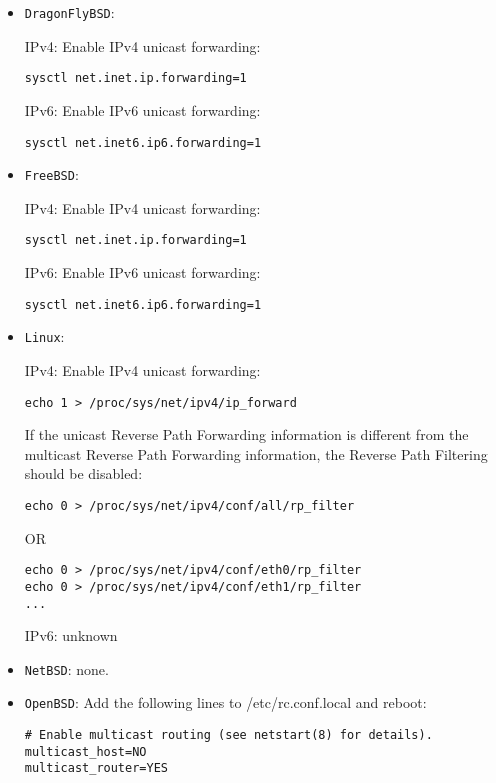 \begin{itemize}
\begin{itemize}
    \item {\tt DragonFlyBSD}:

    IPv4: Enable IPv4 unicast forwarding:

\begin{verbatim}
sysctl net.inet.ip.forwarding=1
\end{verbatim}

    IPv6: Enable IPv6 unicast forwarding:

\begin{verbatim}
sysctl net.inet6.ip6.forwarding=1
\end{verbatim}

    \item {\tt FreeBSD}:

    IPv4: Enable IPv4 unicast forwarding:

\begin{verbatim}
sysctl net.inet.ip.forwarding=1
\end{verbatim}

    IPv6: Enable IPv6 unicast forwarding:

\begin{verbatim}
sysctl net.inet6.ip6.forwarding=1
\end{verbatim}

    \item {\tt Linux}:

    IPv4: Enable IPv4 unicast forwarding:

\begin{verbatim}
echo 1 > /proc/sys/net/ipv4/ip_forward
\end{verbatim}

    If the unicast Reverse Path Forwarding information is different from the
    multicast Reverse Path Forwarding information, the Reverse Path Filtering
    should be disabled:

\begin{verbatim}
echo 0 > /proc/sys/net/ipv4/conf/all/rp_filter
\end{verbatim}
    OR
\begin{verbatim}
echo 0 > /proc/sys/net/ipv4/conf/eth0/rp_filter
echo 0 > /proc/sys/net/ipv4/conf/eth1/rp_filter
...
\end{verbatim}

    IPv6: unknown

    \item {\tt NetBSD}: none.

    \item {\tt OpenBSD}: Add the following lines to {\stt /etc/rc.conf.local}
    and reboot:

\begin{verbatim}
# Enable multicast routing (see netstart(8) for details).
multicast_host=NO
multicast_router=YES
\end{verbatim}

  \end{itemize}

\end{itemize}

